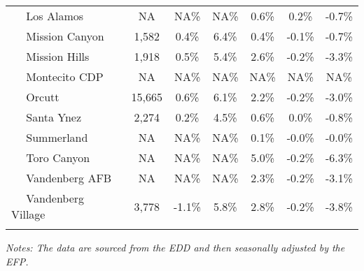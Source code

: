 \documentclass[12pt]{article}
\begin{document}
\begin{landscape}
\begin{table}
\begin{tabular}{|l|c|c|c||c|c|c|}
$\quad$ Los Alamos & NA & NA\% & NA\% & 0.6\% & 0.2\% & -0.7\% \\
$\quad$ Mission Canyon & 1,582 & 0.4\% & 6.4\% & 0.4\% & -0.1\% & -0.7\% \\
$\quad$ Mission Hills & 1,918 & 0.5\% & 5.4\% & 2.6\% & -0.2\% & -3.3\% \\
$\quad$ Montecito CDP & NA & NA\% & NA\% & NA\% & NA\% & NA\% \\
$\quad$ Orcutt & 15,665 & 0.6\% & 6.1\% & 2.2\% & -0.2\% & -3.0\% \\
$\quad$ Santa Ynez & 2,274 & 0.2\% & 4.5\% & 0.6\% & 0.0\% & -0.8\% \\
$\quad$ Summerland & NA & NA\% & NA\% & 0.1\% & -0.0\% & -0.0\% \\
$\quad$ Toro Canyon & NA & NA\% & NA\% & 5.0\% & -0.2\% & -6.3\% \\
$\quad$ Vandenberg AFB & NA & NA\% & NA\% & 2.3\% & -0.2\% & -3.1\% \\
$\quad$ Vandenberg Village & 3,778 & -1.1\% & 5.8\% & 2.8\% & -0.2\% & -3.8\% \\
&&&&&& \\ \hline \hline
\end{tabular}
\par
\vspace{.5em}
\footnotesize
\textit{Notes: The data are sourced from the EDD and then seasonally adjusted by the EFP.}
\end{table}
\end{landscape}
\end{document}
